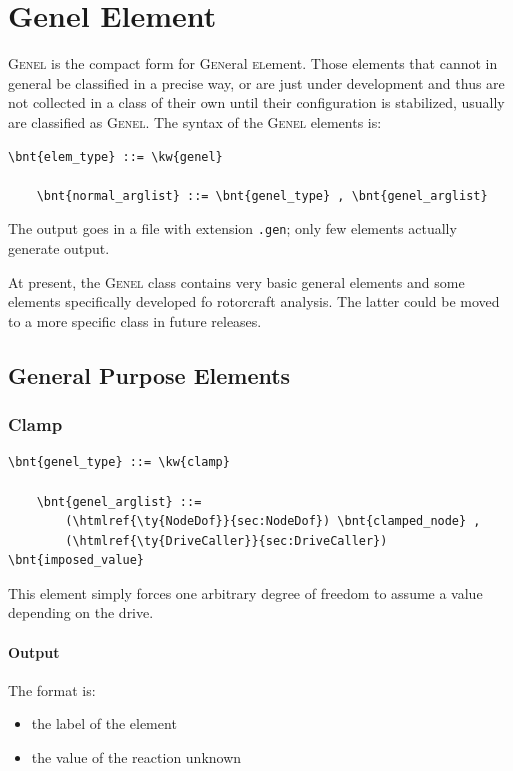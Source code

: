 \section{Genel Element}
\label{sec:EL:GENEL}
\textsc{Genel} is the compact form for \textsc{Gen}eral \textsc{el}ement.
Those elements that cannot in general be classified in a precise way, 
or are just under development and thus are not collected in a class 
of their own until their configuration is stabilized, usually are
classified as \textsc{Genel}.
The syntax of the \textsc{Genel} elements is:
\begin{Verbatim}[commandchars=\\\{\}]
    \bnt{elem_type} ::= \kw{genel}

    \bnt{normal_arglist} ::= \bnt{genel_type} , \bnt{genel_arglist}
\end{Verbatim}

\noindent
The output goes in a file with extension \texttt{.gen}; only few elements
actually generate output.

\noindent
At present, the \textsc{Genel} class contains very basic general elements
and some elements specifically developed fo rotorcraft analysis.
The latter could be moved to a more specific class in future releases.

\subsection{General Purpose Elements}
   
\subsubsection{Clamp}
\label{sec:EL:GENEL:CLAMP}
\begin{Verbatim}[commandchars=\\\{\}]
    \bnt{genel_type} ::= \kw{clamp}

    \bnt{genel_arglist} ::=
        (\htmlref{\ty{NodeDof}}{sec:NodeDof}) \bnt{clamped_node} ,
        (\htmlref{\ty{DriveCaller}}{sec:DriveCaller}) \bnt{imposed_value}
\end{Verbatim}
This element simply forces one arbitrary degree of freedom to assume a value
depending on the drive.

\paragraph{Output}
The format is:
\begin{itemize}
    \item the label of the element
    \item the value of the reaction unknown
\end{itemize}
  
